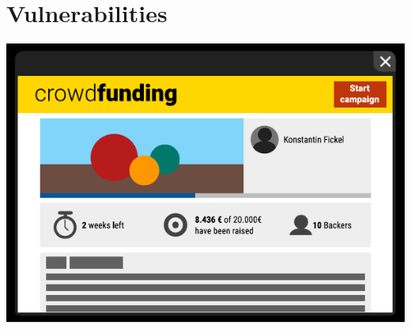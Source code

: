 \documentclass[xcolor=x11names,compress]{beamer}
\begin{document}
\section{Vulnerabilities}
\begin{frame}
	\begin{center}
		\includegraphics[width=\textwidth,height=0.8\textheight,keepaspectratio]{img/crowdfunding/01.pdf}
	\end{center}
\end{frame}
\end{document}
